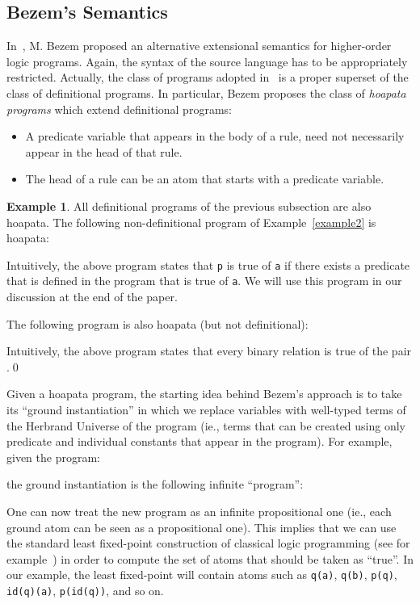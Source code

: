 \documentclass[submission,copyright]{eptcs}
\theoremstyle{definition}
\newtheorem{example}{Example}
\begin{document}
\subsection{Bezem's Semantics}
In~\cite{Bezem99,Bezem01}, M. Bezem proposed an alternative extensional semantics for higher-order
logic programs. Again, the syntax of the source language has to be appropriately restricted.
Actually, the class of programs adopted in~\cite{Bezem99,Bezem01} is a proper superset of the
class of definitional programs. In particular, Bezem proposes the class of {\em hoapata programs} which
extend definitional programs:
\begin{itemize}
\item A predicate variable that appears in the body of a rule, need not
      necessarily appear in the head of that rule.

\item The head of a rule can be an atom that starts with a predicate variable.
\end{itemize}
\begin{example}
All definitional programs of the previous subsection are also hoapata.
The following non-definitional program of Example~\ref{example2} is hoapata:

Intuitively, the above program states that {\tt p} is true of {\tt a}
if there exists a predicate that is defined in the program
that is true of {\tt a}. We will use this program
in our discussion at the end of the paper.

The following program is also hoapata (but not definitional):

Intuitively, the above program states that every binary relation is
true of the pair .\qed
\end{example}

Given a hoapata program, the starting idea behind Bezem's approach is to take its
``ground instantiation'' in which we replace variables with well-typed terms of
the Herbrand Universe of the program (ie., terms that can be created using only
predicate and individual constants that appear in the program).  For example, given
the program:

the ground instantiation is the following infinite ``program'':

One can now treat the new program as an infinite propositional one (ie., each ground atom can be seen
as a propositional one). This implies that we can use the standard least fixed-point construction
of classical logic programming (see for example~\cite{lloyd}) in order to compute the set of atoms
that should be taken as ``true''.  In our example, the least fixed-point will
contain atoms such as {\tt q(a)}, {\tt q(b)}, {\tt p(q)}, {\tt id(q)(a)}, {\tt p(id(q))},
and so on.
\end{document}
